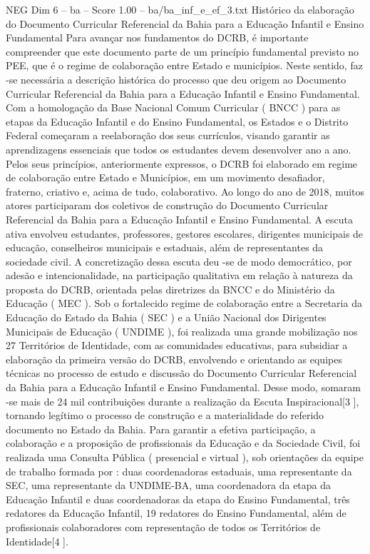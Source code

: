 \begin{textsample}{NEG Dim 6 – ba – Score 1.00 – ba/ba\_inf\_e\_ef\_3.txt}  \label{ex:f6_neg_216}
Histórico da elaboração do Documento Curricular Referencial da Bahia para a Educação Infantil e Ensino Fundamental Para avançar nos fundamentos do DCRB, é importante compreender que este documento parte de um princípio fundamental previsto no PEE, que é o regime de colaboração entre Estado e municípios.
Neste sentido, faz -se necessária a descrição histórica do processo que deu origem ao Documento Curricular Referencial da Bahia para a Educação Infantil e Ensino Fundamental.
Com a homologação da Base Nacional Comum Curricular ( BNCC ) para as etapas da Educação Infantil e do Ensino Fundamental, os Estados e o Distrito Federal começaram a reelaboração dos seus currículos, visando garantir as aprendizagens essenciais que todos os estudantes devem desenvolver ano a ano.
Pelos seus princípios, anteriormente expressos, o DCRB foi elaborado em regime de colaboração entre Estado e Municípios, em um movimento desafiador, fraterno, criativo e, acima de tudo, colaborativo.
Ao longo do ano de 2018, muitos atores participaram dos coletivos de construção do Documento Curricular Referencial da Bahia para a Educação Infantil e Ensino Fundamental.
A escuta ativa envolveu estudantes, professores, gestores escolares, dirigentes municipais de educação, conselheiros municipais e estaduais, além de representantes da sociedade civil.
A concretização dessa escuta deu -se de modo democrático, por adesão e intencionalidade, na participação qualitativa em relação à natureza da proposta do DCRB, orientada pelas diretrizes da BNCC e do Ministério da Educação ( MEC ).
Sob o fortalecido regime de colaboração entre a Secretaria da Educação do Estado da Bahia ( SEC ) e a União Nacional dos Dirigentes Municipais de Educação ( UNDIME ), foi realizada uma grande mobilização nos 27 Territórios de Identidade, com as comunidades educativas, para subsidiar a elaboração da primeira versão do DCRB, envolvendo e orientando as equipes técnicas no processo de estudo e discussão do Documento Curricular Referencial da Bahia para a Educação Infantil e Ensino Fundamental.
Desse modo, somaram -se mais de 24 mil contribuições durante a realização da Escuta Inspiracional[3 ], tornando legítimo o processo de construção e a materialidade do referido documento no Estado da Bahia.
Para garantir a efetiva participação, a colaboração e a proposição de profissionais da Educação e da Sociedade Civil, foi realizada uma Consulta Pública ( presencial e virtual ), sob orientações da equipe de trabalho formada por : duas coordenadoras estaduais, uma representante da SEC, uma representante da UNDIME-BA, uma coordenadora da etapa da Educação Infantil e duas coordenadoras da etapa do Ensino Fundamental, três redatores da Educação Infantil, 19 redatores do Ensino Fundamental, além de profissionais colaboradores com representação de todos os Territórios de Identidade[4 ].

\end{textsample}
